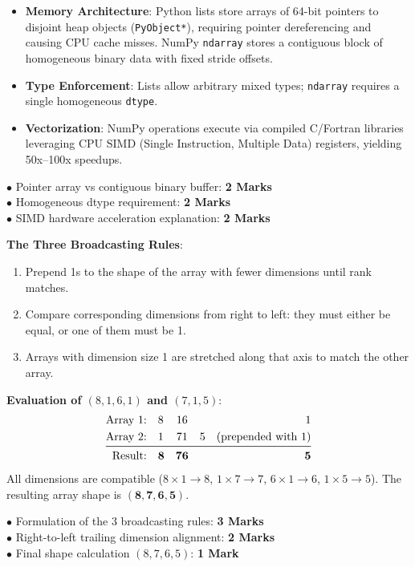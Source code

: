 \begin{solutionbox}
\begin{itemize}[leftmargin=1.5em]
    \item \textbf{Memory Architecture}: Python lists store arrays of 64-bit pointers to disjoint heap objects (\texttt{PyObject*}), requiring pointer dereferencing and causing CPU cache misses. NumPy \texttt{ndarray} stores a contiguous block of homogeneous binary data with fixed stride offsets.
    \item \textbf{Type Enforcement}: Lists allow arbitrary mixed types; \texttt{ndarray} requires a single homogeneous \texttt{dtype}.
    \item \textbf{Vectorization}: NumPy operations execute via compiled C/Fortran libraries leveraging CPU SIMD (Single Instruction, Multiple Data) registers, yielding 50x--100x speedups.
\end{itemize}
\begin{markingrubric}
$\bullet$ Pointer array vs contiguous binary buffer: \textbf{2 Marks}\\
$\bullet$ Homogeneous dtype requirement: \textbf{2 Marks}\\
$\bullet$ SIMD hardware acceleration explanation: \textbf{2 Marks}
\end{markingrubric}
\end{solutionbox}

\begin{solutionbox}
\textbf{The Three Broadcasting Rules}:
\begin{enumerate}[leftmargin=1.5em]
    \item Prepend 1s to the shape of the array with fewer dimensions until rank matches.
    \item Compare corresponding dimensions from right to left: they must either be equal, or one of them must be 1.
    \item Arrays with dimension size 1 are stretched along that axis to match the other array.
\end{enumerate}
\textbf{Evaluation of $(8, 1, 6, 1)$ and $(7, 1, 5)$}:
\begin{align*}
\text{Array 1:} \quad & 8 & 1 & 6 & 1 \\
\text{Array 2:} \quad & 1 & 7 & 1 & 5 \quad \text{(prepended with 1)} \\
\midrule
\text{Result:} \quad & \mathbf{8} & \mathbf{7} & \mathbf{6} & \mathbf{5}
\end{align*}
All dimensions are compatible ($8 \times 1 \to 8$, $1 \times 7 \to 7$, $6 \times 1 \to 6$, $1 \times 5 \to 5$). The resulting array shape is $\mathbf{(8, 7, 6, 5)}$.
\begin{markingrubric}
$\bullet$ Formulation of the 3 broadcasting rules: \textbf{3 Marks}\\
$\bullet$ Right-to-left trailing dimension alignment: \textbf{2 Marks}\\
$\bullet$ Final shape calculation $(8, 7, 6, 5)$: \textbf{1 Mark}
\end{markingrubric}
\end{solutionbox}

